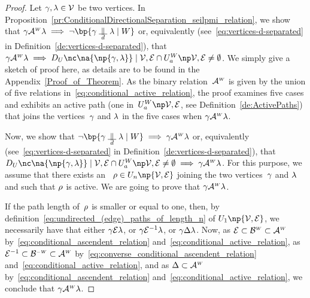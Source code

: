 \documentclass[12pt]{article}
\begin{document}
{{{\begin{proof}
  Let \( \gamma,\lambda \in {\cal V} \) be two vertices. 
  In Proposition~\ref{pr:ConditionalDirectionalSeparation_seilpmi_relation},
  we show that 
  \( \bgent \ConditionalActive \cgent \implies 
  \neg \bp{\bgent \ConditionalDirectionalSeparation \cgent \mid \AgentSubsetW}
  \) or, equivalently (see~\eqref{eq:vertices-d-separated} in
  Definition~\ref{de:vertices-d-separated}), that 
  \(  \bgent {\ConditionalActive} \cgent \implies
  \DeploymentInUPaths{\na{\np{\bgent,\cgent}}}{\graph} 
  \cap \ActiveUndirectedPaths{\graph} 
  \neq\emptyset \).
  We simply give a sketch of proof here, as details are to be found in the Appendix~\ref{Proof_of_Theorem}. 
  As the binary relation~\(  \mathcal{A}^{\text{\tiny $W$}} \) is given by the union of five
  relations in~\eqref{eq:conditional_active_relation},
  the proof examines five cases and exhibits an active path
  (one in~\( \ActiveUndirectedPaths{\graph} \), see Definition~\ref{de:ActivePaths})
  that joins the vertices~\( \gamma \) and \( \lambda \) in the five cases
  when \( \gamma \mathcal{A}^{\text{\tiny $W$}} \lambda \). 
  \medskip

  Now,  we show that 
  \( \neg \bp{\bgent \ConditionalDirectionalSeparation \cgent \mid \AgentSubsetW}
  \implies \bgent \ConditionalActive \cgent \) or, equivalently (see~\eqref{eq:vertices-d-separated} in
  Definition~\ref{de:vertices-d-separated}), that 
  \(
  \DeploymentInUPaths{\na{\np{\bgent,\cgent}}}{\graph} 
  \cap \ActiveUndirectedPaths{\graph} 
  \neq\emptyset 
  \implies
  \bgent {\ConditionalActive} \cgent \).
  For this purpose, we assume that there exists an \undirectedEdgePath\
  \( \UndirectedPath \in \UPATH_{n}\np{\graph} \)
  joining the two vertices~$\gamma$ and $\lambda$ and such that \( \rho
  \) is active.
  We are going to prove that $\gamma \mathcal{A}^{\text{\tiny $W$}}\lambda$.
  
  If the path length of~\( \rho \) is smaller or equal to one, then,
  by definition~\eqref{eq:undirected_(edge)_paths_of_length_n} of
  $\UPATH_{1}\np{\OrientedGraph}$, we necessarily have that
  either $\gamma {\cal E}\lambda$, or $\gamma {\cal E}^{-1}\lambda$,
  or $\gamma \Delta\lambda$.
  Now, as \( {\cal E} \subset \mathcal{B}^{\text{\tiny $W$}} \subset
  \mathcal{A}^{\text{\tiny $W$}} \)
  by~\eqref{eq:conditional_ascendent_relation}
  and~\eqref{eq:conditional_active_relation}, 
  as \( {\cal E}^{-1} \subset \mathcal{B}^{\text{\tiny$-W$}} \subset
  \mathcal{A}^{\text{\tiny $W$}} \)
  by~\eqref{eq:converse_conditional_ascendent_relation}
  and~\eqref{eq:conditional_active_relation}, 
  and as \( \Delta \subset \mathcal{A}^{\text{\tiny $W$}} \)
  by~\eqref{eq:conditional_ascendent_relation}
  and~\eqref{eq:conditional_active_relation},
  we conclude that $\gamma \mathcal{A}^{\text{\tiny $W$}} \lambda$.
  

\end{proof}}}}
\end{document}
